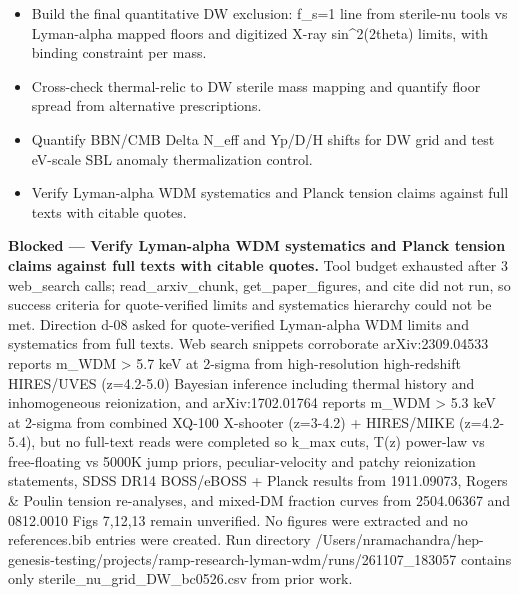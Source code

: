 \documentclass[11pt,a4paper]{article}
\begin{document}
\begin{itemize}
  \item Build the final quantitative DW exclusion: f\_s=1 line from sterile-nu tools vs Lyman-alpha mapped floors and digitized X-ray sin\textasciicircum{}2(2theta) limits, with binding constraint per mass.
  \item Cross-check thermal-relic to DW sterile mass mapping and quantify floor spread from alternative prescriptions.
  \item Quantify BBN/CMB Delta N\_eff and Yp/D/H shifts for DW grid and test eV-scale SBL anomaly thermalization control.
  \item Verify Lyman-alpha WDM systematics and Planck tension claims against full texts with citable quotes.
\end{itemize}
\textbf{Blocked --- Verify Lyman-alpha WDM systematics and Planck tension claims against full texts with citable quotes.} Tool budget exhausted after 3 web\_search calls; read\_arxiv\_chunk, get\_paper\_figures, and cite did not run, so success criteria for quote-verified limits and systematics hierarchy could not be met. Direction d-08 asked for quote-verified Lyman-alpha WDM limits and systematics from full texts. Web search snippets corroborate arXiv:2309.04533 reports m\_WDM \textgreater{} 5.7 keV at 2-sigma from high-resolution high-redshift HIRES/UVES (z=4.2-5.0) Bayesian inference including thermal history and inhomogeneous reionization, and arXiv:1702.01764 reports m\_WDM \textgreater{} 5.3 keV at 2-sigma from combined XQ-100 X-shooter (z=3-4.2) + HIRES/MIKE (z=4.2-5.4), but no full-text reads were completed so k\_max cuts, T(z) power-law vs free-floating vs 5000K jump priors, peculiar-velocity and patchy reionization statements, SDSS DR14 BOSS/eBOSS + Planck results from 1911.09073, Rogers \& Poulin tension re-analyses, and mixed-DM fraction curves from 2504.06367 and 0812.0010 Figs 7,12,13 remain unverified. No figures were extracted and no references.bib entries were created. Run directory /Users/nramachandra/hep-genesis-testing/projects/ramp-research-lyman-wdm/runs/261107\_183057 contains only sterile\_nu\_grid\_DW\_bc0526.csv from prior work.
\end{document}
